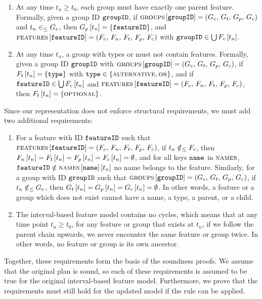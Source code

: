 \begin{enumerate}[\wf{\arabic*}, itemsep=0mm]
   \item At any time $t_n \geq t_0$, each group must have exactly one parent feature. Formally, given a group ID $\texttt{groupID}$, if $\textsc{groups}{} \left[ \texttt{groupID} \right] = \left(G_e,\, G_t,\, G_p,\, G_c\right)$ and $t_n \in_\leq G_e$, then $G_p \left[ t_n \right] = \left\{\texttt{featureID}\right\}$, and $\textsc{features} \left[ \texttt{featureID} \right] = \left(F_e,\, F_n,\, F_t,\, F_p,\, F_c\right)$ with $\texttt{groupID} \in \bigcup F_c \left[ t_n \right]$.
   \item At any time $t_n$, a group with types \xortype{} or \ortype{} must not contain \mandatory{} features. Formally, given a group ID $\texttt{groupID}$ with $\textsc{groups}{} \left[ \texttt{groupID} \right] = \left(G_e,\, G_t,\, G_p,\, G_c\right)$, if $F_t \left[ t_n \right] = \left\{\texttt{type}\right\}$ with $\texttt{type} \in \left\{\textsc{alternative}{}, \textsc{or}{}\right\}$, and if $\texttt{featureID} \in \bigcup F_c \left[ t_n \right]$ and $\textsc{features} \left[ \texttt{featureID} \right] = \left(F_e,\, F_n,\, F_t,\, F_p,\, F_c\right)$, then $F_t \left[ t_n \right] = \left\{\textsc{optional}\right\}$.
\end{enumerate}

Since our representation does not enforce structural requirements, we must add two additional requirements:
\begin{enumerate}[itemsep=0mm]
   \item[\wf{8}] For a feature with ID $\texttt{featureID}$ such that $\textsc{features} \left[ \texttt{featureID} \right] = \left(F_e,\, F_n,\, F_t,\, F_p,\, F_c\right)$, if $t_n \notin_\leq F_e$, then $F_n \left[ t_n \right] = F_t \left[ t_n \right] = F_p \left[ t_n \right] = F_c \left[ t_n \right] = \emptyset$, and for all keys $\texttt{name}$ in $\textsc{names}$, $\texttt{featureID} \notin \textsc{names} \left[ \texttt{name} \right] \left[ t_n \right]$ \textemdash{} no name belongs to the feature. Similarly, for a group with ID $\texttt{groupID}$ such that $\textsc{groups}{} \left[ \texttt{groupID} \right] = \left(G_e,\, G_t,\, G_p,\, G_c\right)$, if $t_n \notin_\leq G_e$, then $G_t \left[ t_n \right] = G_p \left[ t_n \right] = G_c \left[ t_n \right] = \emptyset$. In other words, a feature or a group which does not exist cannot have a name, a type, a parent, or a child.
   \item[\wf{9}] The interval-based feature model contains no cycles, which means that at any time point $t_n \geq t_0$, for any feature or group that exists at $t_n$, if we follow the parent chain upwards, we never encounter the same feature or group twice. In other words, no feature or group is its own ancestor.
\end{enumerate}

Together, these requirements form the basis of the soundness proofs. We assume that the original plan is sound, so each of these requirements is assumed to be true for the original interval-based feature model. Furthermore, we prove that the requirements must still hold for the updated model if the rule can be applied.

